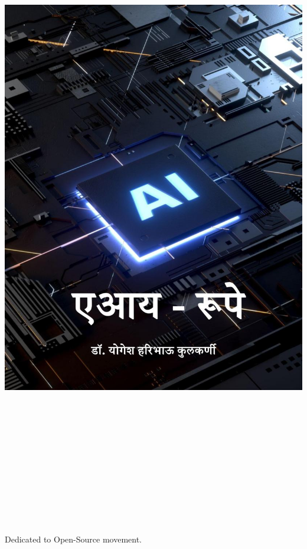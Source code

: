 \begin{titlepage}
   \centering
    \vfill
    \thispagestyle{empty}
    \includegraphics[width=8.25in,height=11.67in]{airupe_cover_image}
    \restoregeometry
\end{titlepage}

\begin{dedication}
Dedicated to Open-Source movement.
\end{dedication}

\tableofcontents

\mainmatter




